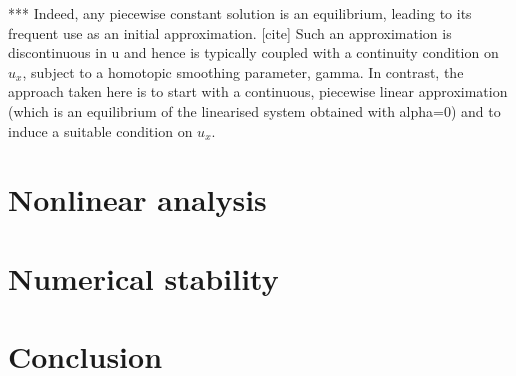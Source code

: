 \documentclass[12pt,a4paper]{article}
\begin{document}
***
Indeed, any piecewise constant solution is an equilibrium, leading to its frequent use as an initial approximation.
[cite]
Such an approximation is discontinuous in u and hence is typically coupled with a continuity condition on $u_x$,
subject to a homotopic smoothing parameter, gamma.
In contrast, the approach taken here is to start with a continuous, piecewise linear approximation 
(which is an equilibrium of the linearised system obtained with alpha=0) 
and to induce a suitable condition on $u_x$.

\section{Nonlinear analysis}\label{sec:nonlin}

\section{Numerical stability}\label{sec:numeric}

\section{Conclusion}
\end{document}

